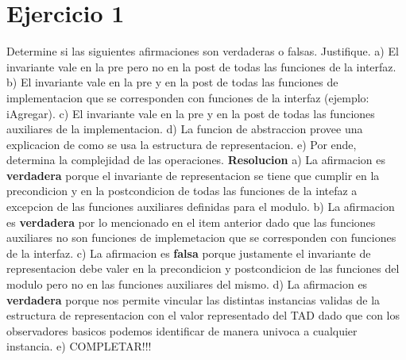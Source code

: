 \documentclass[10pt,a4paper]{article}
\begin{document}
\section{Ejercicio 1}

Determine si las siguientes afirmaciones son verdaderas o falsas. Justifique.
\newline
\newline
a) El invariante vale en la pre pero no en la post de todas las funciones de la interfaz.
\newline
\newline
b) El invariante vale en la pre y en la post de todas las funciones de implementacion que se corresponden con funciones de la interfaz (ejemplo: iAgregar).
\newline
\newline
c) El invariante vale en la pre y en la post de todas las funciones auxiliares de la implementacion.
\newline
\newline
d) La funcion de abstraccion provee una explicacion de como se usa la estructura de representacion.
\newline
\newline
e) Por ende, determina la complejidad de las operaciones.
\newline
\newline
\textbf{Resolucion}
\newline
\newline
a) La afirmacion es \textbf{verdadera} porque el invariante de representacion se tiene que cumplir en la precondicion y en la postcondicion de todas las funciones de la intefaz a excepcion de las funciones auxiliares definidas para el modulo.
\newline
\newline
b) La afirmacion es \textbf{verdadera} por lo mencionado en el item anterior dado que las funciones auxiliares no son funciones de implemetacion que se corresponden con funciones de la interfaz. 
\newline
\newline
c) La afirmacion es \textbf{falsa} porque justamente el invariante de representacion debe valer en la precondicion y postcondicion de las funciones del modulo pero no en las funciones auxiliares del mismo.
\newline
\newline
d) La afirmacion es \textbf{verdadera} porque nos permite vincular las distintas instancias validas de la estructura de representacion con el valor representado del TAD dado que con los observadores basicos podemos identificar de manera univoca a cualquier instancia.
\newline
\newline
e) COMPLETAR!!!
\newpage
\end{document}
